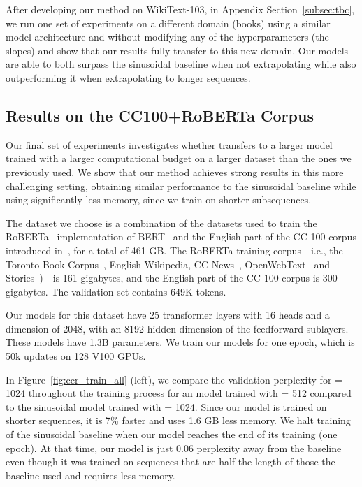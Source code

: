 After developing our method on WikiText-103, in Appendix Section~\ref{subsec:tbc}, we run one set of experiments on a  different domain (books) using a similar model architecture and without modifying any of the \al hyperparameters (the slopes) and show that our results fully transfer to this new domain. Our models are able to both surpass the sinusoidal baseline when not extrapolating while also outperforming it when extrapolating to longer sequences. 


\subsection{Results on the CC100+RoBERTa Corpus}

Our final set of experiments investigates whether \al transfers to a larger model trained with a larger computational budget on a larger dataset than the ones we previously used. We show that our method achieves strong results in this more challenging setting, obtaining similar performance to the sinusoidal baseline while using significantly less memory, since we train on shorter subsequences. 

The dataset we choose is a combination of the datasets used to train the RoBERTa~\citep{roberta} implementation of BERT~\citep{bert} and the English part of the CC-100 corpus introduced in~\cite{cc-100}, for a total of 461 GB. The RoBERTa training corpus---i.e., the Toronto Book Corpus~\citep{zhu2015aligning}, English Wikipedia, CC-News~\citep{ccnews}, OpenWebText~\citep{openwebtext} and Stories~\citep{stories})---is 161 gigabytes, and the English part of the CC-100 corpus is 300 gigabytes. 
The validation set contains 649K tokens.

 





Our models for this dataset have 25 transformer layers with 16 heads and a dimension of 2048, with an 8192 hidden dimension of the feedforward sublayers.
These models have 1.3B parameters. 
We train our models for one epoch, which is 50k updates on 128 V100 GPUs.





In Figure~\ref{fig:ccr_train_all} (left), we compare the validation perplexity for \li = 1024 throughout the training process for an \al model trained with \lt = 512 compared to the sinusoidal model trained with \lt = 1024. Since our model is trained on shorter sequences, it is 7\% faster and uses 1.6 GB less memory. We halt training of the sinusoidal baseline when our model reaches the end of its training (one epoch). 
At that time, our model is just 0.06 perplexity away from the baseline even though it was trained on sequences that are half the length of those the baseline used and requires less memory.

